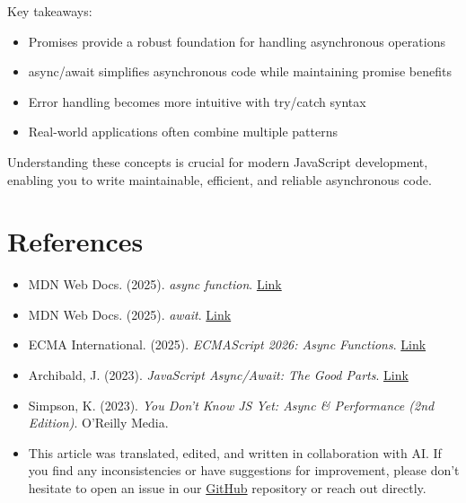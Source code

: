 Key takeaways:
\begin{itemize}
    \item Promises provide a robust foundation for handling asynchronous operations
    \item async/await simplifies asynchronous code while maintaining promise benefits
    \item Error handling becomes more intuitive with try/catch syntax
    \item Real-world applications often combine multiple patterns
\end{itemize}

Understanding these concepts is crucial for modern JavaScript development, enabling you to write maintainable, efficient, and reliable asynchronous code.

\section{References}

\begin{itemize}
    \item MDN Web Docs. (2025). \textit{async function}. \href{https://developer.mozilla.org/en-US/docs/Web/JavaScript/Reference/Statements/async_function}{Link}
    
    \item MDN Web Docs. (2025). \textit{await}. \href{https://developer.mozilla.org/en-US/docs/Web/JavaScript/Reference/Operators/await}{Link}
    
    \item ECMA International. (2025). \textit{ECMAScript 2026: Async Functions}. \href{https://tc39.es/ecma262/#sec-async-function-definitions}{Link}
    
    \item Archibald, J. (2023). \textit{JavaScript Async/Await: The Good Parts}. \href{https://web.dev/articles/async-functions}{Link}
    
    \item Simpson, K. (2023). \textit{You Don't Know JS Yet: Async \& Performance (2nd Edition)}. O'Reilly Media.

    \item This article was translated, edited, and written in collaboration with AI. If you find any inconsistencies or have suggestions for improvement, please don't hesitate to open an issue in our \href{https://github.com/asanchezyali/social-media-posts}{GitHub} repository or reach out directly.
\end{itemize}

